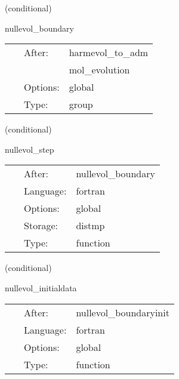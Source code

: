 \vspace{5mm}

   (conditional) 

\hspace{5mm} nullevol\_boundary 

\hspace{5mm}{\it boundary data } 


\hspace{5mm}

 \begin{tabular*}{160mm}{cll} 
~ & After:  & harmevol\_to\_adm \\ 
~& ~ &mol\_evolution\\ 
~ & Options:  & global \\ 
~ & Type:  & group \\ 
\end{tabular*} 


\vspace{5mm}

   (conditional) 

\hspace{5mm} nullevol\_step 

\hspace{5mm}{\it evolution } 


\hspace{5mm}

 \begin{tabular*}{160mm}{cll} 
~ & After:  & nullevol\_boundary \\ 
~ & Language:  & fortran \\ 
~ & Options:  & global \\ 
~ & Storage:  & distmp \\ 
~ & Type:  & function \\ 
\end{tabular*} 


\vspace{5mm}

   (conditional) 

\hspace{5mm} nullevol\_initialdata 

\hspace{5mm}{\it give j on the initial null hypersurface } 


\hspace{5mm}

 \begin{tabular*}{160mm}{cll} 
~ & After:  & nullevol\_boundaryinit \\ 
~ & Language:  & fortran \\ 
~ & Options:  & global \\ 
~ & Type:  & function \\ 
\end{tabular*} 


